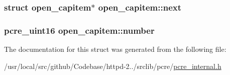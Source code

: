 \subsubsection[{\texorpdfstring{next}{next}}]{\setlength{\rightskip}{0pt plus 5cm}struct {\bf open\+\_\+capitem}$\ast$ open\+\_\+capitem\+::next}\hypertarget{structopen__capitem_a17c798a7eb4e1b655cdb621114d50fb7}{}\label{structopen__capitem_a17c798a7eb4e1b655cdb621114d50fb7}
\subsubsection[{\texorpdfstring{number}{number}}]{\setlength{\rightskip}{0pt plus 5cm}pcre\+\_\+uint16 open\+\_\+capitem\+::number}\hypertarget{structopen__capitem_ad3164afb02e13546cbcdbefba746ab91}{}\label{structopen__capitem_ad3164afb02e13546cbcdbefba746ab91}


The documentation for this struct was generated from the following file\+:\begin{DoxyCompactItemize}
\item 
/usr/local/src/github/\+Codebase/httpd-\/2../srclib/pcre/\hyperlink{pcre__internal_8h}{pcre\+\_\+internal.\+h}\end{DoxyCompactItemize}
